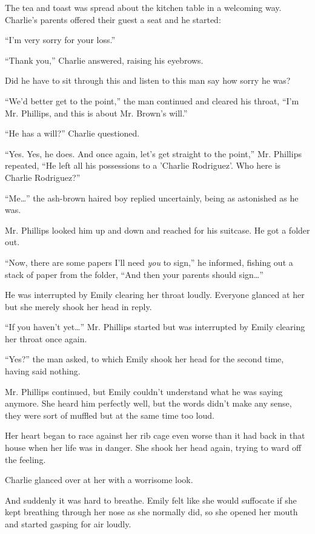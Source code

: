 The tea and toast was spread about the kitchen table in a welcoming way. Charlie's parents offered their guest a seat and he started:

“I'm very sorry for your loss.”

“Thank you,” Charlie answered, raising his eyebrows.

Did he have to sit through this and listen to this man say how sorry he was?

“We'd better get to the point,” the man continued and cleared his throat, “I'm Mr. Phillips, and this is about Mr. Brown's will.”

“He has a will?” Charlie questioned.

“Yes. Yes, he does. And once again, let's get straight to the point,” Mr. Phillips repeated, “He left all his possessions to a 'Charlie Rodriguez'. Who here is Charlie Rodriguez?”

“Me…” the ash-brown haired boy replied uncertainly, being as astonished as he was.

Mr. Phillips looked him up and down and reached for his suitcase. He got a folder out.

“Now, there are some papers I'll need \textit{you} to sign,” he informed, fishing out a stack of paper from the folder, “And then your parents should sign…”

He was interrupted by Emily clearing her throat loudly. Everyone glanced at her but she merely shook her head in reply.

“If you haven't yet…” Mr. Phillips started but was interrupted by Emily clearing her throat once again.

“Yes?” the man asked, to which Emily shook her head for the second time, having said nothing.

Mr. Phillips continued, but Emily couldn't understand what he was saying anymore. She heard him perfectly well, but the words didn't make any sense, they were sort of muffled but at the same time too loud.

Her heart began to race against her rib cage even worse than it had back in that house when her life was in danger. She shook her head again, trying to ward off the feeling.

Charlie glanced over at her with a worrisome look.

And suddenly it was hard to breathe. Emily felt like she would suffocate if she kept breathing through her nose as she normally did, so she opened her mouth and started gasping for air loudly.

